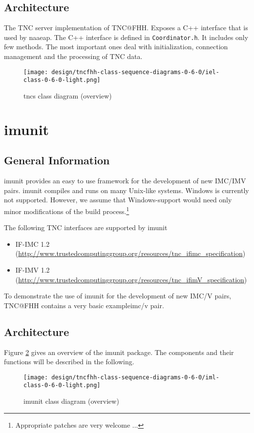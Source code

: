 \documentclass[a4paper,10pt]{scrartcl}
\begin{document}
\subsection{Architecture}
The TNC server implementation of TNC@FHH. Exposes a C++ interface that is used
by naaeap. The C++ interface is defined in \texttt{Coordinator.h}. It includes
only few methods. The most important ones deal with initialization, connection management
and the processing of TNC data.

\begin{figure}
 \centering
 \texttt{[image: design/tncfhh-class-sequence-diagrams-0-6-0/iel-class-0-6-0-light.png]}
 \caption{tncs class diagram (overview)}
 \label{fig:tncs-overview}
\end{figure}

\section{imunit}
\subsection{General Information}
imunit provides an easy to use framework for the development of new IMC/IMV
pairs. imunit compiles and runs on many Unix-like systems. Windows is currently
not supported. However, we assume that Windows-support would need only minor
modifications of the build process.\footnote{Appropriate patches are very
welcome ...}

The following TNC interfaces are supported by imunit
\begin{itemize}
 \item IF-IMC 1.2 (\url{http://www.trustedcomputinggroup.org/resources/tnc_ifimc_specification})
 \item IF-IMV 1.2 (\url{http://www.trustedcomputinggroup.org/resources/tnc_ifimV_specification})
\end{itemize}

To demonstrate the use of imunit for the development of new IMC/V pairs, TNC@FHH
contains a very basic exampleimc/v pair.

\subsection{Architecture}
Figure \ref{fig:imunit-overview} gives an overview of the imunit package. The components and
their functions will be described in the following.
\begin{figure}
 \centering
 \texttt{[image: design/tncfhh-class-sequence-diagrams-0-6-0/iml-class-0-6-0-light.png]}
 \caption{imunit class diagram (overview)}
 \label{fig:imunit-overview}
\end{figure}
\end{document}
